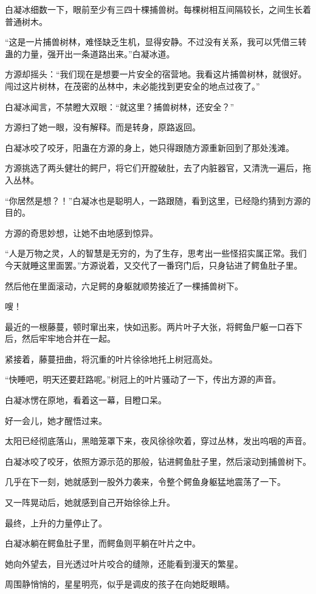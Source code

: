 \begin{this_body}
白凝冰细数一下，眼前至少有三四十棵捕兽树。每棵树相互间隔较长，之间生长着普通树木。

“这是一片捕兽树林，难怪缺乏生机，显得安静。不过没有关系，我可以凭借三转蛊的力量，强开出一条道路出来。”白凝冰道。

方源却摇头：“我们现在是想要一片安全的宿营地。我看这片捕兽树林，就很好。闯过这片树林，在茂密的丛林中，未必能找到更安全的地点过夜了。”

白凝冰闻言，不禁瞪大双眼：“就这里？捕兽树林，还安全？”

方源扫了她一眼，没有解释。而是转身，原路返回。

白凝冰咬了咬牙，阳蛊在方源的身上，她只得跟随方源重新回到了那处浅滩。

方源挑选了两头健壮的鳄尸，将它们开膛破肚，去了内脏器官，又清洗一遍后，拖入丛林。

“你居然是想？！”白凝冰也是聪明人，一路跟随，看到这里，已经隐约猜到方源的目的。

方源的奇思妙想，让她不由地感到惊异。

“人是万物之灵，人的智慧是无穷的，为了生存，思考出一些怪招实属正常。我们今天就睡这里面罢。”方源说着，又交代了一番窍门后，只身钻进了鳄鱼肚子里。

然后他在里面滚动，六足鳄的身躯就顺势接近了一棵捕兽树下。

嗖！

最近的一根藤蔓，顿时窜出来，快如迅影。两片叶子大张，将鳄鱼尸躯一口吞下后，然后牢牢地合并在一起。

紧接着，藤蔓扭曲，将沉重的叶片徐徐地托上树冠高处。

“快睡吧，明天还要赶路呢。”树冠上的叶片骚动了一下，传出方源的声音。

白凝冰愣在原地，看着这一幕，目瞪口呆。

好一会儿，她才醒悟过来。

太阳已经彻底落山，黑暗笼罩下来，夜风徐徐吹着，穿过丛林，发出呜咽的声音。

白凝冰咬了咬牙，依照方源示范的那般，钻进鳄鱼肚子里，然后滚动到捕兽树下。

几乎在下一刻，她就感到一股外力袭来，令整个鳄鱼身躯猛地震荡了一下。

又一阵晃动后，她就感到自己开始徐徐上升。

最终，上升的力量停止了。

白凝冰躺在鳄鱼肚子里，而鳄鱼则平躺在叶片之中。

她向外望去，目光透过叶片咬合的缝隙，还能看到漫天的繁星。

周围静悄悄的，星星明亮，似乎是调皮的孩子在向她眨眼睛。


\end{this_body}
